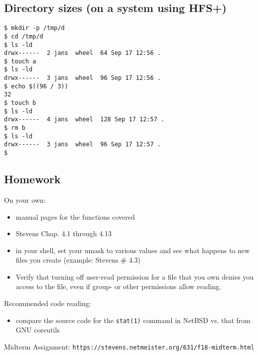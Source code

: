 \documentclass[xga]{xdvislides}
\begin{document}
\subsection{Directory sizes (on a system using HFS+)}
\begin{verbatim}
$ mkdir -p /tmp/d
$ cd /tmp/d
$ ls -ld
drwx------  2 jans  wheel  64 Sep 17 12:56 .
$ touch a
$ ls -ld
drwx------  3 jans  wheel  96 Sep 17 12:56 .
$ echo $((96 / 3))
32
$ touch b
$ ls -ld
drwx------  4 jans  wheel  128 Sep 17 12:57 .
$ rm b
$ ls -ld
drwx------  3 jans  wheel  96 Sep 17 12:57 .
$
\end{verbatim}

\subsection{Homework}
On your own:
\begin{itemize}
	\item manual pages for the functions covered
	\item Stevens Chap. 4.1 through 4.13
	\item in your shell, set your umask to various values and see what
          happens to new files you create (example: Stevens \# 4.3)
	\item Verify that turning off user-read permission for a file that you own
		denies you access to the file, even if group- or other permissions
		allow reading.
\end{itemize}
Recommended code reading:
\begin{itemize}
	\item compare the source code for the {\tt stat(1)} command in NetBSD vs. that from GNU coreutils
\end{itemize}
\addvspace{.5in}
Midterm Assignment:
\verb+https://stevens.netmeister.org/631/f18-midterm.html+
\end{document}
